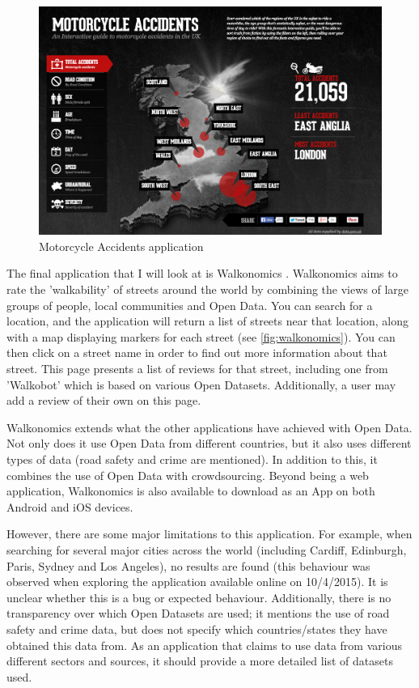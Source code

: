 \documentclass[authoryearcitations]{UoYCSproject}
\begin{document}
\begin{figure}
	\center
	\includegraphics[scale=0.3]{motorcycle}
	\caption{Motorcycle Accidents application}
	\label{fig:motorcycle}
\end{figure}

The final application that I will look at is Walkonomics \citep{Davies}. Walkonomics aims to rate the 'walkability' of streets around the world by combining the views of large groups of people, local communities and Open Data. You can search for a location, and the application will return a list of streets near that location, along with a map displaying markers for each street (see \autoref{fig:walkonomics}). You can then click on a street name in order to find out more information about that street. This page presents a list of reviews for that street, including one from 'Walkobot' which is based on various Open Datasets. Additionally, a user may add a review of their own on this page. 

Walkonomics extends what the other applications have achieved with Open Data. Not only does it use Open Data from different countries, but it also uses different types of data (road safety and crime are mentioned). In addition to this, it combines the use of Open Data with crowdsourcing. Beyond being a web application, Walkonomics is also available to download as an App on both Android and iOS devices.

However, there are some major limitations to this application. For example, when searching for several major cities across the world (including Cardiff, Edinburgh, Paris, Sydney and Los Angeles), no results are found (this behaviour was observed when exploring the application available online on 10/4/2015). It is unclear whether this is a bug or expected behaviour. Additionally, there is no transparency over which Open Datasets are used; it mentions the use of road safety and crime data, but does not specify which countries/states they have obtained this data from. As an application that claims to use data from various different sectors and sources, it should provide a more detailed list of datasets used.
\end{document}
